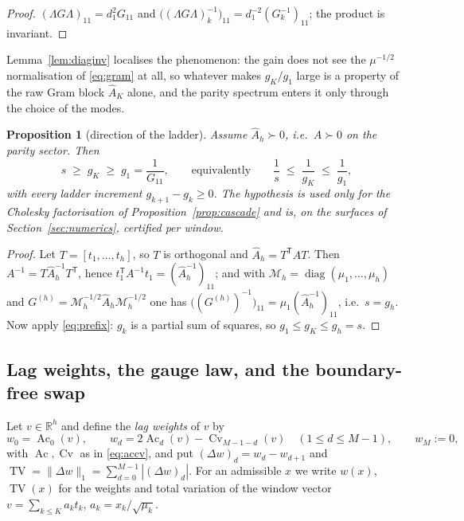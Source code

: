 \documentclass[11pt,a4paper]{article}
\theoremstyle{plain}
\newtheorem{proposition}[theorem]{Proposition}
\theoremstyle{definition}
\newcommand{\R}{\mathbb{R}}
\newcommand{\T}{\mathsf{T}}
\newcommand{\PD}{\succ 0}
\newcommand{\Ah}{\widehat{A}}
\newcommand{\MM}{\mathcal{M}}
\newcommand{\TV}{\operatorname{TV}}
\newcommand{\Ac}{\operatorname{Ac}}
\newcommand{\Cv}{\operatorname{Cv}}
\DeclareMathOperator{\diag}{diag}
\begin{document}
\begin{proof}
$(\Lambda G\Lambda)_{11}=d_1^{2}G_{11}$ and
$\bigl((\Lambda G\Lambda)_k^{-1}\bigr)_{11}=d_1^{-2}(G_k^{-1})_{11}$; the
product is invariant.
\end{proof}

Lemma~\ref{lem:diaginv} localises the phenomenon: the gain does not see the
$\mu^{-1/2}$ normalisation of \eqref{eq:gram} at all, so whatever makes
$g_K/g_1$ large is a property of the raw Gram block $\Ah_K$ alone, and the
parity spectrum enters it only through the choice of the modes.

\begin{proposition}[direction of the ladder]
\label{prop:direction}
Assume $\Ah_h\PD$, i.e.\ $A\PD$ on the parity sector. Then
\begin{equation}
\label{eq:direction}
  s\;\ge\;g_K\;\ge\;g_1=\frac1{G_{11}},
  \qquad\text{equivalently}\qquad
  \frac1s\;\le\;\frac1{g_K}\;\le\;\frac1{g_1},
\end{equation}
with every ladder increment $g_{k+1}-g_k\ge0$. The hypothesis is used only for
the Cholesky factorisation of Proposition~\ref{prop:cascade} and is, on the
surfaces of Section~\ref{sec:numerics}, certified per window.
\end{proposition}

\begin{proof}
Let $T=[t_1,\dots,t_h]$, so $T$ is orthogonal and $\Ah_h=T^{\T}AT$. Then
$A^{-1}=T\Ah_h^{-1}T^{\T}$, hence
$t_1^{\T}A^{-1}t_1=(\Ah_h^{-1})_{11}$; and with
$\MM_h=\diag(\mu_1,\dots,\mu_h)$ and $G^{(h)}=\MM_h^{-1/2}\Ah_h\MM_h^{-1/2}$
one has $\bigl((G^{(h)})^{-1}\bigr)_{11}=\mu_1(\Ah_h^{-1})_{11}$, i.e.\
$s=g_h$. Now apply \eqref{eq:prefix}: $g_k$ is a partial sum of squares, so
$g_1\le g_K\le g_h=s$.
\end{proof}

\subsection{Lag weights, the gauge law, and the boundary-free swap}
\label{sec:lag}

Let $v\in\R^{h}$ and define the \emph{lag weights} of $v$ by
\begin{equation}
\label{eq:weights}
  w_0=\Ac_0(v),
  \qquad
  w_d=2\Ac_d(v)-\Cv_{M-1-d}(v)\quad(1\le d\le M-1),
  \qquad w_M:=0 ,
\end{equation}
with $\Ac,\Cv$ as in \eqref{eq:accv}, and put $(\Delta w)_d=w_d-w_{d+1}$ and
$\TV=\lVert\Delta w\rVert_1=\sum_{d=0}^{M-1}|(\Delta w)_d|$. For an admissible
$x$ we write $w(x)$, $\TV(x)$ for the weights and total variation of the window
vector $v=\sum_{k\le K}a_kt_k$, $a_k=x_k/\sqrt{\mu_k}$.
\end{document}
